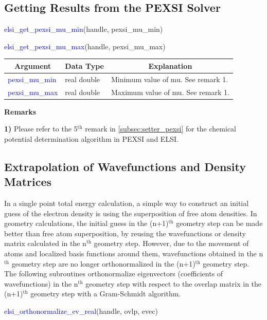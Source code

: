 \documentclass{report}
\newcommand{\tcb}[1]{\textcolor{blue}{#1}}
\begin{document}
\subsection{Getting Results from the PEXSI Solver}
\label{subsec:getter_pexsi}
\begin{labeling}{\hspace{6cm}}
\item [\hspace{0.3cm} \tcb{elsi\_get\_pexsi\_mu\_min}(handle, pexsi\_mu\_min)]
\item [\hspace{0.3cm} \tcb{elsi\_get\_pexsi\_mu\_max}(handle, pexsi\_mu\_max)]
\end{labeling}

\begin{tabular}[]{|p{30mm}|p{45mm}|p{90mm}|}
\hline
\multicolumn{1}{|c|}{\textbf{Argument}} & \multicolumn{1}{c|}{\textbf{Data Type}} & \multicolumn{1}{c|}{\textbf{Explanation}}\\
\hline
\tcb{pexsi\_mu\_min} & real double & Minimum value of mu. See remark 1.\\
\hline
\tcb{pexsi\_mu\_max} & real double & Maximum value of mu. See remark 1.\\
\hline
\end{tabular}

\textbf{Remarks}

\textbf{1)} Please refer to the 5$^\text{th}$ remark in \ref{subsec:setter_pexsi} for the chemical potential determination algorithm in PEXSI and ELSI.

\subsection{Extrapolation of Wavefunctions and Density Matrices}
\label{subsec:extrapolation}
In a single point total energy calculation, a simple way to construct an initial guess of the electron density is using the superposition of free atom densities. In geometry calculations, the initial guess in the (n+1)$^\text{th}$ geometry step can be made better than free atom superposition, by reusing the wavefunctions or density matrix calculated in the n$^\text{th}$ geometry step. However, due to the movement of atoms and localized basis functions around them, wavefunctions obtained in the n$^\text{th}$ geometry step are no longer orthonormalized in the (n+1)$^\text{th}$ geometry step. The following subroutines orthonormalize eigenvectors (coefficients of wavefunctions) in the n$^\text{th}$ geometry step with respect to the overlap matrix in the (n+1)$^\text{th}$ geometry step with a Gram-Schmidt algorithm.
\begin{labeling}{\hspace{6cm}}
\item [\hspace{0.3cm} \tcb{elsi\_orthonormalize\_ev\_real}(handle, ovlp, evec)]
\end{labeling}
\end{document}
